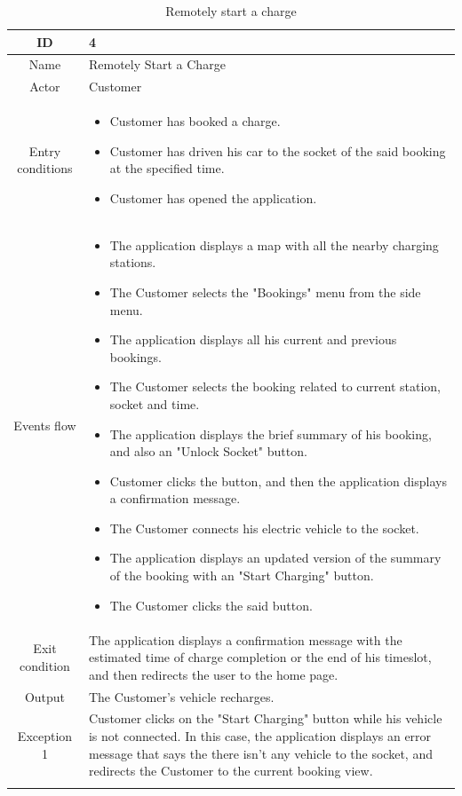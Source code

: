 \begin{longtable}{|c| p{10cm}|}
    \hline ID        & 4\\
    \hline
    Name     & Remotely Start a Charge \\
    \hline
    Actor            & Customer\\
    \hline
    Entry conditions & \begin{itemize}[nosep,after=\strut]
        \item Customer has booked a charge.
        \item Customer has driven his car to the socket of the said booking at the specified time.
        \item Customer has opened the application.
    \end{itemize}
        \\
    \hline
    Events flow      & \begin{itemize}[nosep,after=\strut]
        \item The application displays a map with all the nearby charging stations.
        \item The Customer selects the "Bookings" menu from the side menu.
        \item The application displays all his current and previous bookings.
        \item The Customer selects the booking related to current station, socket and time.
        \item The application displays the brief summary of his booking, and also an "Unlock Socket" button.
        \item Customer clicks the button, and then the application displays a confirmation message. 
        \item The Customer connects his electric vehicle to the socket.
        \item The application displays an updated version of the summary of the booking with an "Start Charging" button.
        \item The Customer clicks the said button.
    \end{itemize}\\
    \hline
    Exit condition   & The application displays a confirmation message with the estimated time of charge completion or the end of his timeslot, and then redirects the user to the home page.\\
    \hline
    Output           &  The Customer's vehicle recharges.
    \\
    \hline
    \hline
    Exception 1      &  Customer clicks on the "Start Charging" button while his vehicle is not connected. In this case, the application displays an error message that says the there isn't any vehicle to the socket, and redirects the Customer to the current booking view. \\
    \hline
    \caption{Remotely start a charge}\\
\end{longtable}
